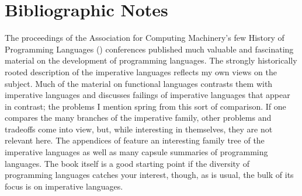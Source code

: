 \section{Bibliographic Notes}\label{imperative:defining:notes}
The proceedings of the Association for Computing Machinery's few History of Programming Languages () conferences published much valuable and fascinating material on the development of programming languages. The strongly historically rooted description of the imperative languages reflects my own views on the subject. Much of the material on functional languages contrasts them with imperative languages and discusses failings of imperative languages that appear in contrast; the problems I mention spring from this sort of comparison. If one compares the many branches of the imperative family, other problems and tradeoffs come into view, but, while interesting in themselves, they are not relevant here. The appendices of \citet{Scott:Programming:2006} feature an interesting family tree of the imperative languages as well as many capsule summaries of programming languages. The book itself is a good starting point if the diversity of programming languages catches your interest, though, as is usual, the bulk of its focus is on imperative languages.